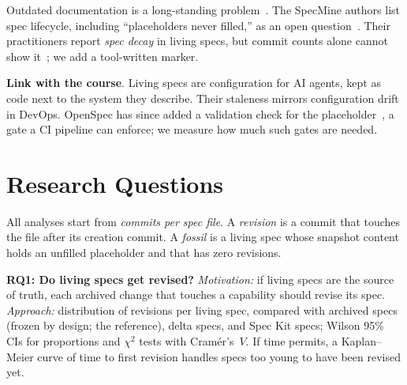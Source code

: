 \documentclass[10pt, conference]{IEEEtran}
\renewcommand{\paragraph}[1]{\noindent\textbf{#1}.}
\begin{document}
Outdated documentation is a long-standing problem~\cite{lethbridge2003,aghajani2019,tan2024}.
The SpecMine authors list spec lifecycle, including ``placeholders never filled,'' as an
open question~\cite{specmine_paper}. Their practitioners report \emph{spec decay} in living
specs, but commit counts alone cannot show it~\cite{specmine_paper}; we add a
tool-written marker.

\paragraph{Link with the course} Living specs are configuration for AI agents,
kept as code next to the system they describe. Their staleness mirrors configuration drift
in DevOps. OpenSpec has since added a validation check for the
placeholder~\cite{openspec_pr1671}, a gate a CI pipeline can enforce; we measure how much
such gates are needed.

\section{Research Questions}
\label{sec:research-idea}

All analyses start from \emph{commits per spec file}. A \emph{revision} is a
commit that touches the file after its creation commit. A \emph{fossil} is a living spec
whose snapshot content holds an unfilled placeholder and that has zero revisions.

\textbf{RQ1: Do living specs get revised?} \emph{Motivation:} if living specs are the
source of truth, each archived change that touches a capability should revise its spec.
\emph{Approach:} distribution of revisions per living spec, compared with archived specs
(frozen by design; the reference), delta specs, and Spec Kit specs; Wilson 95\% CIs for
proportions and $\chi^2$ tests with Cram\'er's~$V$. If time permits, a Kaplan--Meier curve of time to first
revision handles specs too young to have been revised yet.
\end{document}
